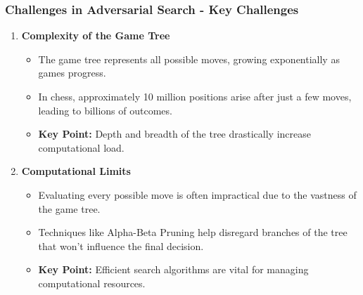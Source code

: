 \documentclass[aspectratio=169]{beamer}
\begin{document}
\begin{frame}[fragile]
    \frametitle{Challenges in Adversarial Search - Key Challenges}
    \begin{enumerate}
        \item \textbf{Complexity of the Game Tree}
            \begin{itemize}
                \item The game tree represents all possible moves, growing exponentially as games progress. 
                \item In chess, approximately 10 million positions arise after just a few moves, leading to billions of outcomes.
                \item \textbf{Key Point:} Depth and breadth of the tree drastically increase computational load.
            \end{itemize}

        \item \textbf{Computational Limits}
            \begin{itemize}
                \item Evaluating every possible move is often impractical due to the vastness of the game tree.
                \item Techniques like Alpha-Beta Pruning help disregard branches of the tree that won't influence the final decision.
                \item \textbf{Key Point:} Efficient search algorithms are vital for managing computational resources.
            \end{itemize}
    \end{enumerate}
\end{frame}
\end{document}
